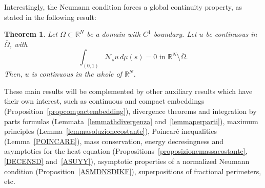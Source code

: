 \documentclass[12pt,a4paper,intlimits,sumlimits]{amsart}
\def \R {\mathbb{R}}
\def \Ns {\mathscr{N}_{s}}
\theoremstyle{definition}
\theoremstyle{plain}
\newtheorem{theorem}[definition]{Theorem}
\numberwithin{equation}{section}
\begin{document}
Interestingly, the Neumann condition forces a global continuity property, as stated in the following result:

\begin{theorem}\label{propcontinuità}
Let $\Omega\subset \R^N$ be a domain with $C^1$ boundary. Let 
$u$ be continuous in $\overline{\Omega}$, with 
\begin{equation}\label{NNN}
\int_{(0,1)}\Ns u\,d\mu(s)=0 \mbox{ in } \R^N\setminus \overline{\Omega}.
\end{equation}
Then, $u$ is continuous in the whole of $\R^N$.
\end{theorem}

These main results will be complemented by other auxiliary results
which have their own interest, such as
continuous and compact embeddings (Proposition~\ref{propcompactembedding}),
divergence theorems and integration by parts formulas
(Lemmata~\ref{lemmathdivergenza}
and~\ref{lemmaperparti}),
maximum principles (Lemma~\ref{lemmasoluzionecostante}),
Poincaré inequalities (Lemma~\ref{POINCARE}),
mass conservation, energy decresingness and asymptotics for the heat equation
(Propositions~\ref{proposizionemassacostante}, \ref{DECENSD} and~\ref{ASUYY}),
asymptotic properties of a normalized Neumann condition (Proposition~\ref{ASMDNSDIKF}), 
superpositions of fractional perimeters, etc.
\end{document}
